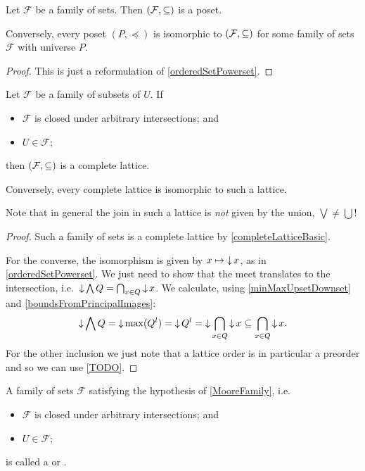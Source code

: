 \begin{proposition} \label{posetPowerset}
Let $\mathcal{F}$ be a family of sets. Then $\left( \mathcal{F}, \subseteq \right)$ is a poset.

Conversely, every poset $(P,\preceq)$ is isomorphic to $\left( \mathcal{F}, \subseteq \right)$ for some family of sets $\mathcal{F}$ with universe $P$.
\end{proposition}
\begin{proof}
This is just a reformulation of \ref{orderedSetPowerset}.
\end{proof}
\begin{corollary} \label{MooreFamily}
Let $\mathcal{F}$ be a family of subsets of $U$. If
\begin{itemize}
\item $\mathcal{F}$ is closed under arbitrary intersections; and
\item $U \in \mathcal{F}$;
\end{itemize}
then $\left( \mathcal{F},\subseteq \right)$ is a complete lattice.

Conversely, every complete lattice is isomorphic to such a lattice.
\end{corollary}
Note that in general the join in such a lattice is \emph{not} given by the union, $\bigvee \neq \bigcup$!
\begin{proof}
Such a family of sets is a complete lattice by \ref{completeLatticeBasic}.

For the converse, the isomorphism is given by $x\mapsto \operatorname{\downarrow} x$, as in \ref{orderedSetPowerset}. We just need to show that the meet translates to the intersection, i.e.\ $\operatorname{\downarrow} \bigwedge Q = \bigcap_{x\in Q}\operatorname{\downarrow} x$. We calculate, using \ref{minMaxUpsetDownset} and \ref{boundsFromPrincipalImages}:
\[ \operatorname{\downarrow} \bigwedge Q = \operatorname{\downarrow} \max(Q^l) = \operatorname{\downarrow} Q^l = \operatorname{\downarrow} \bigcap_{x\in Q} \operatorname{\downarrow} x \subseteq \bigcap_{x\in Q} \operatorname{\downarrow} x. \]
For the other inclusion we just note that a lattice order is in particular a  preorder and so we can use \ref{TODO}.
\end{proof}

\begin{definition}
A family of sets $\mathcal{F}$ satisfying the hypothesis of \ref{MooreFamily}, i.e.\
\begin{itemize}
\item $\mathcal{F}$ is closed under arbitrary intersections; and
\item $U \in \mathcal{F}$;
\end{itemize}
is called a  or .
\end{definition}

